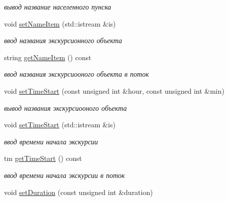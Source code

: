 \begin{DoxyCompactItemize}
\begin{DoxyCompactList}\small\item\em вывод название населенного пунска \end{DoxyCompactList}\item 
\hypertarget{class_item_a80e0444dcf74fa46cc93acf03ac785f9}{}void \hyperlink{class_item_a80e0444dcf74fa46cc93acf03ac785f9}{set\+Name\+Item} (std\+::istream \&is)\label{class_item_a80e0444dcf74fa46cc93acf03ac785f9}

\begin{DoxyCompactList}\small\item\em ввод названия экскурсионного объекта \end{DoxyCompactList}\item 
\hypertarget{class_item_ac1d5462440e6e7ce3eb4c233a01572bb}{}string \hyperlink{class_item_ac1d5462440e6e7ce3eb4c233a01572bb}{get\+Name\+Item} () const \label{class_item_ac1d5462440e6e7ce3eb4c233a01572bb}

\begin{DoxyCompactList}\small\item\em ввод названия экскурсиооного объекта в поток \end{DoxyCompactList}\item 
\hypertarget{class_item_ae132cf1854d8fe37d4e04251b70a1947}{}void \hyperlink{class_item_ae132cf1854d8fe37d4e04251b70a1947}{set\+Time\+Start} (const unsigned int \&hour, const unsigned int \&min)\label{class_item_ae132cf1854d8fe37d4e04251b70a1947}

\begin{DoxyCompactList}\small\item\em вывод названия экскурсиооного объекта \end{DoxyCompactList}\item 
\hypertarget{class_item_a5ab6e4d465de10ebe2cac323f392f111}{}void \hyperlink{class_item_a5ab6e4d465de10ebe2cac323f392f111}{set\+Time\+Start} (std\+::istream \&is)\label{class_item_a5ab6e4d465de10ebe2cac323f392f111}

\begin{DoxyCompactList}\small\item\em ввод времени начала экскурсии \end{DoxyCompactList}\item 
\hypertarget{class_item_a4947c0cc15e90d0271927c94f91e2367}{}tm \hyperlink{class_item_a4947c0cc15e90d0271927c94f91e2367}{get\+Time\+Start} () const \label{class_item_a4947c0cc15e90d0271927c94f91e2367}

\begin{DoxyCompactList}\small\item\em ввод времени начала экскурсии в поток \end{DoxyCompactList}\item 
\hypertarget{class_item_a5d8a338a95052112bfd9e88b602f263b}{}void \hyperlink{class_item_a5d8a338a95052112bfd9e88b602f263b}{set\+Duration} (const unsigned int \&duration)\label{class_item_a5d8a338a95052112bfd9e88b602f263b}


\end{DoxyCompactItemize}
